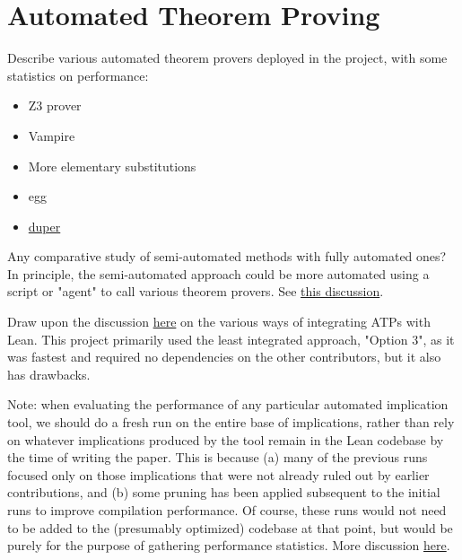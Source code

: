 \section{Automated Theorem Proving}\label{automated-sec}


Describe various automated theorem provers deployed in the project, with some statistics on performance:

\begin{itemize}
    \item Z3 prover
    \item Vampire
    \item More elementary substitutions
    \item egg
    \item \href{https://leanprover.zulipchat.com/#narrow/channel/458659-Equational/topic/Austin.20pairs/near/479643838}{duper}
\end{itemize}

Any comparative study of semi-automated methods with fully automated ones? In principle, the semi-automated approach could be more automated using a script or "agent" to call various theorem provers. See \href{https://leanprover.zulipchat.com/#narrow/stream/458659-Equational/topic/A.20magma.20of.20order.20.3C.2013.20-.20for.20Equation2531.3F}{this discussion}.

Draw upon the discussion \href{https://leanprover.zulipchat.com/#narrow/stream/458659-Equational/topic/Future.20of.20Using.20ATPs}{here} on the various ways of integrating ATPs with Lean. This project primarily used the least integrated approach, "Option 3", as it was fastest and required no dependencies on the other contributors, but it also has drawbacks.

Note: when evaluating the performance of any particular automated implication tool, we should do a fresh run on the entire base of implications, rather than rely on whatever implications produced by the tool remain in the Lean codebase by the time of writing the paper. This is because (a) many of the previous runs focused only on those implications that were not already ruled out by earlier contributions, and (b) some pruning has been applied subsequent to the initial runs to improve compilation performance. Of course, these runs would not need to be added to the (presumably optimized) codebase at that point, but would be purely for the purpose of gathering performance statistics. More discussion \href{https://leanprover.zulipchat.com/#narrow/stream/458659-Equational/topic/RECORDS.20REQUEST.3A.20data.20and.20performance.20automated.20run.20metrics}{here}.

